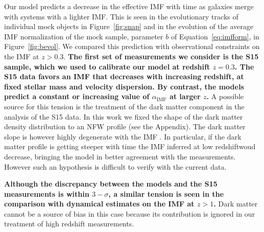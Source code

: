 \documentclass[usenatbib, letters]{mnras}
\def\aimf{\alpha_{\mathrm{IMF}}}
\def\Fref#1{Figure~\ref{#1}\xspace}
\def\Eref#1{Equation~\ref{#1}\xspace}
\begin{document}
Our model predicts a decrease in the effective IMF with time as galaxies merge with systems with a lighter IMF. This is seen in the evolutionary tracks of individual mock objects in \Fref{fig:snap} and in the evolution of the average IMF normalization of the mock sample, parameter $b$ of \Eref{eq:imfform}, in \Fref{fig:bevol}.
We compared this prediction with observational constraints on the IMF at $z>0.3$. 
{\bf
The first set of measurements we consider is the S15 sample, which we used to calibrate our model at redshift $z=0.3$. The S15 data favors an IMF that decreases with increasing redshift, at fixed stellar mass and velocity dispersion. By contrast, the models predict a constant or increasing value of $\aimf$ at larger $z$.
}
A possible source for this tension is the treatment of the dark matter component in the analysis of the S15 data. In this work we fixed the shape of the dark matter density distribution to an NFW profile (see the Appendix). The dark matter slope is however highly degenerate with the IMF \citep[see e.g.][]{Aug++10}. In particular, if the dark matter profile is getting steeper with time the IMF inferred at low redshiftwoud decrease, bringing the model in better agreement with the measurements. However such an hypothesis is difficult to verify with the current data.

{\bf
Although the discrepancy between the models and the S15 measurements is within $3-\sigma$, a similar tension is seen in the comparison with dynamical estimates on the IMF at $z>1$.
}
Dark matter cannot be a source of bias in this case because its contribution is ignored in our treatment of high redshift measurements. 
\end{document}
